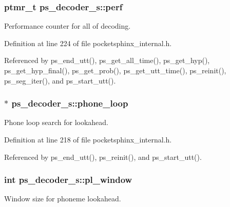 \subsubsection[{perf}]{\setlength{\rightskip}{0pt plus 5cm}ptmr\-\_\-t ps\-\_\-decoder\-\_\-s\-::perf}\label{structps__decoder__s_ab42d1d1e300d2a6df5dd3cd796a27d43}


Performance counter for all of decoding. 



Definition at line 224 of file pocketsphinx\-\_\-internal.\-h.



Referenced by ps\-\_\-end\-\_\-utt(), ps\-\_\-get\-\_\-all\-\_\-time(), ps\-\_\-get\-\_\-hyp(), ps\-\_\-get\-\_\-hyp\-\_\-final(), ps\-\_\-get\-\_\-prob(), ps\-\_\-get\-\_\-utt\-\_\-time(), ps\-\_\-reinit(), ps\-\_\-seg\-\_\-iter(), and ps\-\_\-start\-\_\-utt().

\subsubsection[{phone\-\_\-loop}]{$\ast$ ps\-\_\-decoder\-\_\-s\-::phone\-\_\-loop}\label{structps__decoder__s_a0c6d141d7a71a1287be00a1ebcc7643d}


Phone loop search for lookahead. 



Definition at line 218 of file pocketsphinx\-\_\-internal.\-h.



Referenced by ps\-\_\-end\-\_\-utt(), ps\-\_\-reinit(), and ps\-\_\-start\-\_\-utt().

\subsubsection[{pl\-\_\-window}]{\setlength{\rightskip}{0pt plus 5cm}int ps\-\_\-decoder\-\_\-s\-::pl\-\_\-window}\label{structps__decoder__s_a0f0a6681ffd98af789f6bed556c814e4}


Window size for phoneme lookahead. 



